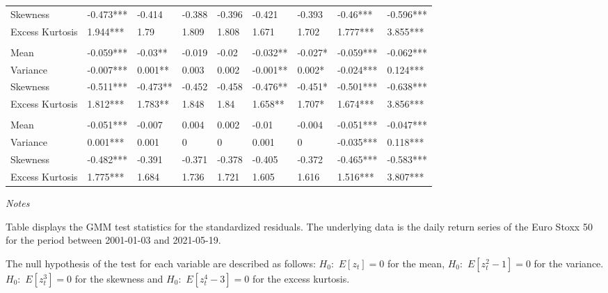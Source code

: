 \documentclass[a4paper, nobind]{templates/ociamthesis}
\begin{document}
\begin{landscape}
\begin{table}[h!]
\begin{threeparttable}
{\begin{tabular}[t]{lllllllll}
\hspace{1em}Skewness & -0.473*** & -0.414 & -0.388 & -0.396 & -0.421 & -0.393 & -0.46*** & -0.596***\\
\hspace{1em}Excess Kurtosis & 1.944*** & 1.79 & 1.809 & 1.808 & 1.671 & 1.702 & 1.777*** & 3.855***\\
\addlinespace[0.3em]
\multicolumn{9}{l}{\textbf{Panel D: T}}\\
\hspace{1em}Mean & -0.059*** & -0.03** & -0.019 & -0.02 & -0.032** & -0.027* & -0.059*** & -0.062***\\
\hspace{1em}Variance & -0.007*** & 0.001** & 0.003 & 0.002 & -0.001** & 0.002* & -0.024*** & 0.124***\\
\hspace{1em}Skewness & -0.511*** & -0.473** & -0.452 & -0.458 & -0.476** & -0.451* & -0.501*** & -0.638***\\
\hspace{1em}Excess Kurtosis & 1.812*** & 1.783** & 1.848 & 1.84 & 1.658** & 1.707* & 1.674*** & 3.856***\\
\addlinespace[0.3em]
\multicolumn{9}{l}{\textbf{Panel E: N}}\\
\hspace{1em}Mean & -0.051*** & -0.007 & 0.004 & 0.002 & -0.01 & -0.004 & -0.051*** & -0.047***\\
\hspace{1em}Variance & 0.001*** & 0.001 & 0 & 0 & 0.001 & 0 & -0.035*** & 0.118***\\
\hspace{1em}Skewness & -0.482*** & -0.391 & -0.371 & -0.378 & -0.405 & -0.372 & -0.465*** & -0.583***\\
\hspace{1em}Excess Kurtosis & 1.775*** & 1.684 & 1.736 & 1.721 & 1.605 & 1.616 & 1.516*** & 3.807***\\
\bottomrule
\end{tabular}}
\begin{tablenotes}[para]
\item \textit{Notes} 
\item Table displays the GMM test statistics for the standardized residuals. The underlying data is the daily return series of the Euro Stoxx 50 for the period between 2001-01-03 and 2021-05-19.
\item The null hypothesis of the test for each variable are described as follows: $H_0: $ $E[z_{t}] = 0$ for the mean, $H_0: $ $E[z_{t}^2-1] = 0$ for the variance. $H_0: $ $E[z_{t}^3] = 0$ for the skewness and $H_0: $ $E[z_{t}^4-3] = 0$ for the excess kurtosis.
\end{tablenotes}
\end{threeparttable}
\end{table}
\end{landscape}
\end{document}
